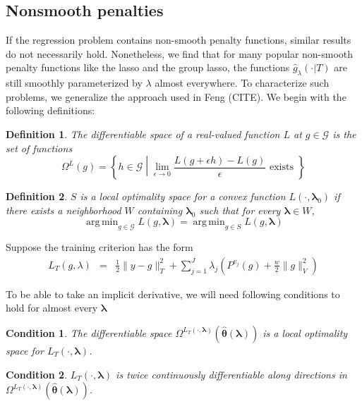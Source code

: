 \documentclass[12pt]{article}
\newtheorem{definition}{Definition}
\newtheorem{condition}{Condition}
\DeclareMathOperator*{\argmin}{arg\,min}
\begin{document}
\subsection{Nonsmooth penalties}\label{sec:nonsmooth}

If the regression problem contains non-smooth penalty functions, similar results do not necessarily hold. Nonetheless, we find that for many popular non-smooth penalty functions like the lasso and the group lasso, the functions $\hat{g}_\lambda(\cdot | T)$ are still smoothly parameterized by $\lambda$ almost everywhere. To characterize such problems, we generalize the approach used in Feng (CITE). We begin with the following definitions:

\begin{definition}
The differentiable space of a real-valued function $L$ at $g \in \mathcal{G}$ is the set of functions
\begin{equation}
\Omega^{L}(g) = \left \{ h \in \mathcal{G} \middle | \lim_{\epsilon \rightarrow 0} \frac{L(g + \epsilon h) - L(g)}{\epsilon} \text{ exists } \right \}
\end{equation}
\end{definition}

\begin{definition}
$S$ is a local optimality space for a convex function $L(\cdot, \boldsymbol \lambda_0)$ if there exists a neighborhood $W$ containing $\boldsymbol \lambda_0$ such that for every $\boldsymbol \lambda \in W$,
\begin{equation}
\argmin_{g \in \mathcal{G}} L(g, \boldsymbol \lambda) =
\argmin_{g \in S} L(g, \boldsymbol \lambda)
\end{equation}
\end{definition}

Suppose the training criterion has the form
\begin{eqnarray*}
L_T(g, \lambda) &=& \frac{1}{2}\|y- g\|_{T}^{2}+ \sum_{j=1}^J \lambda_j \left(P^{v_j}(g)+\frac{w}{2}\|g\|_{V}^{2}\right)
\end{eqnarray*}

To be able to take an implicit derivative, we will need following conditions to hold for almost every $\boldsymbol{\lambda}$
\begin{condition}
The differentiable space $\Omega^{L_T(\cdot, \boldsymbol{\lambda})}(\hat{\boldsymbol \theta}\left(\boldsymbol{\lambda}\right))$ is a local optimality space for $L_T\left(\cdot,\boldsymbol{\lambda}\right)$.
\end{condition}
\begin{condition}
$L_T(\cdot, \boldsymbol{\lambda})$ is twice continuously differentiable along directions in $\Omega^{L_T(\cdot, \boldsymbol{\lambda})}(\hat{\boldsymbol \theta}\left(\boldsymbol{\lambda}\right))$. 
\end{condition}
\end{document}
